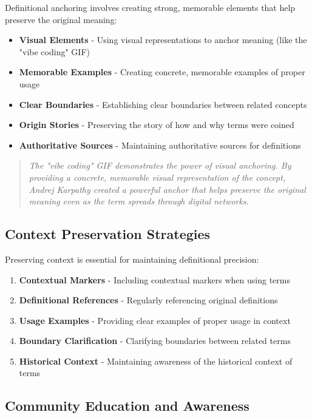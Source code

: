\documentclass[11pt]{article}
\begin{document}
Definitional anchoring involves creating strong, memorable elements that help preserve the original meaning:

\begin{itemize}
\item \textbf{Visual Elements} - Using visual representations to anchor meaning (like the "vibe coding" GIF)
\item \textbf{Memorable Examples} - Creating concrete, memorable examples of proper usage
\item \textbf{Clear Boundaries} - Establishing clear boundaries between related concepts
\item \textbf{Origin Stories} - Preserving the story of how and why terms were coined
\item \textbf{Authoritative Sources} - Maintaining authoritative sources for definitions
\end{itemize}

\begin{quote}
\emph{The "vibe coding" GIF demonstrates the power of visual anchoring. By providing a concrete, memorable visual representation of the concept, Andrej Karpathy created a powerful anchor that helps preserve the original meaning even as the term spreads through digital networks.}
\end{quote}

\subsection{Context Preservation Strategies}

Preserving context is essential for maintaining definitional precision:

\begin{enumerate}
\item \textbf{Contextual Markers} - Including contextual markers when using terms
\item \textbf{Definitional References} - Regularly referencing original definitions
\item \textbf{Usage Examples} - Providing clear examples of proper usage in context
\item \textbf{Boundary Clarification} - Clarifying boundaries between related terms
\item \textbf{Historical Context} - Maintaining awareness of the historical context of terms
\end{enumerate}

\subsection{Community Education and Awareness}
\end{document}
